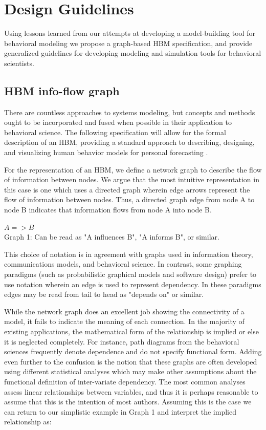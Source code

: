 \documentclass[conference]{IEEEtran}
\begin{document}
\section{Design Guidelines}
Using lessons learned from our attempts at developing a model-building tool for behavioral modeling we propose a graph-based HBM specification, and provide generalized guidelines for developing modeling and simulation tools for behavioral scientists.

\subsection{HBM info-flow graph}
There are countless approaches to systems modeling, but concepts and methods ought to be incorporated and fused when possible in their application to behavioral science.
The following specification will allow for the formal description of an HBM, providing a standard approach to describing, designing, and visualizing human behavior models for personal forecasting .

For the representation of an HBM, we define a network graph to describe the flow of information between nodes.
We argue that the most intuitive representation in this case is one which uses a directed graph wherein edge arrows represent the flow of information between nodes.
Thus, a directed graph edge from node A to node B indicates that information flows from node A into node B. 

\begin{centering}
  $A => B$\\
  \small{Graph 1: Can be read as "A influences B", "A informs B", or similar.}
\end{centering}
  
This choice of notation is in agreement with graphs used in information theory, communications models, and behavioral science.
In contrast, some graphing paradigms (such as probabilistic graphical models and software design) prefer to use notation wherein an edge is used to represent dependency.
In these paradigms edges may be read from tail to head as "depends on" or similar.

While the network graph does an excellent job showing the connectivity of a model, it fails to indicate the meaning of each connection.
In the majority of existing applications, the mathematical form of the relationship is implied or else it is neglected completely.
For instance, path diagrams from the behavioral sciences frequently denote dependence and do not specify functional form.
Adding even further to the confusion is the notion that these graphs are often developed using different statistical analyses which may make other assumptions about the functional definition of inter-variate dependency.
The most common analyses assess linear relationships between variables, and thus it is perhaps reasonable to assume that this is the intention of most authors.
Assuming this is the case we can return to our simplistic example in Graph 1 and interpret the implied relationship as:
\end{document}
